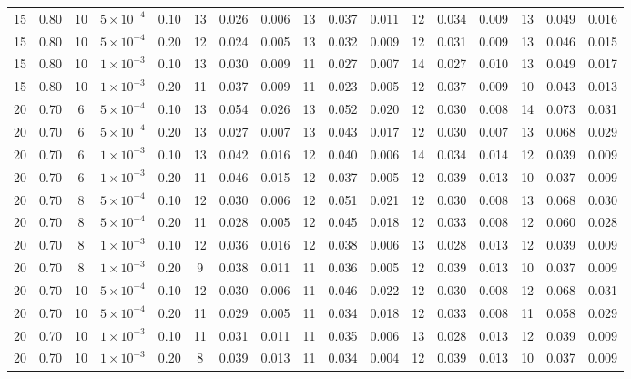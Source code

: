 \begin{longtable}{c c c c c c c c c c c c c c c c c }
15 & 0.80 & 10 & $5{\times}10^{-4}$ & 0.10 & 13 & 0.026 & 0.006 & 13 & 0.037 & 0.011 & 12 & 0.034 & 0.009 & 13 & 0.049 & 0.016 \\
15 & 0.80 & 10 & $5{\times}10^{-4}$ & 0.20 & 12 & 0.024 & 0.005 & 13 & 0.032 & 0.009 & 12 & 0.031 & 0.009 & 13 & 0.046 & 0.015 \\
15 & 0.80 & 10 & $1{\times}10^{-3}$ & 0.10 & 13 & 0.030 & 0.009 & 11 & 0.027 & 0.007 & 14 & 0.027 & 0.010 & 13 & 0.049 & 0.017 \\
15 & 0.80 & 10 & $1{\times}10^{-3}$ & 0.20 & 11 & 0.037 & 0.009 & 11 & 0.023 & 0.005 & 12 & 0.037 & 0.009 & 10 & 0.043 & 0.013 \\
\midrule
20 & 0.70 & 6 & $5{\times}10^{-4}$ & 0.10 & 13 & 0.054 & 0.026 & 13 & 0.052 & 0.020 & 12 & 0.030 & 0.008 & 14 & 0.073 & 0.031 \\
20 & 0.70 & 6 & $5{\times}10^{-4}$ & 0.20 & 13 & 0.027 & 0.007 & 13 & 0.043 & 0.017 & 12 & 0.030 & 0.007 & 13 & 0.068 & 0.029 \\
20 & 0.70 & 6 & $1{\times}10^{-3}$ & 0.10 & 13 & 0.042 & 0.016 & 12 & 0.040 & 0.006 & 14 & 0.034 & 0.014 & 12 & 0.039 & 0.009 \\
20 & 0.70 & 6 & $1{\times}10^{-3}$ & 0.20 & 11 & 0.046 & 0.015 & 12 & 0.037 & 0.005 & 12 & 0.039 & 0.013 & 10 & 0.037 & 0.009 \\
20 & 0.70 & 8 & $5{\times}10^{-4}$ & 0.10 & 12 & 0.030 & 0.006 & 12 & 0.051 & 0.021 & 12 & 0.030 & 0.008 & 13 & 0.068 & 0.030 \\
20 & 0.70 & 8 & $5{\times}10^{-4}$ & 0.20 & 11 & 0.028 & 0.005 & 12 & 0.045 & 0.018 & 12 & 0.033 & 0.008 & 12 & 0.060 & 0.028 \\
20 & 0.70 & 8 & $1{\times}10^{-3}$ & 0.10 & 12 & 0.036 & 0.016 & 12 & 0.038 & 0.006 & 13 & 0.028 & 0.013 & 12 & 0.039 & 0.009 \\
20 & 0.70 & 8 & $1{\times}10^{-3}$ & 0.20 & 9 & 0.038 & 0.011 & 11 & 0.036 & 0.005 & 12 & 0.039 & 0.013 & 10 & 0.037 & 0.009 \\
20 & 0.70 & 10 & $5{\times}10^{-4}$ & 0.10 & 12 & 0.030 & 0.006 & 11 & 0.046 & 0.022 & 12 & 0.030 & 0.008 & 12 & 0.068 & 0.031 \\
20 & 0.70 & 10 & $5{\times}10^{-4}$ & 0.20 & 11 & 0.029 & 0.005 & 11 & 0.034 & 0.018 & 12 & 0.033 & 0.008 & 11 & 0.058 & 0.029 \\
20 & 0.70 & 10 & $1{\times}10^{-3}$ & 0.10 & 11 & 0.031 & 0.011 & 11 & 0.035 & 0.006 & 13 & 0.028 & 0.013 & 12 & 0.039 & 0.009 \\
20 & 0.70 & 10 & $1{\times}10^{-3}$ & 0.20 & 8 & 0.039 & 0.013 & 11 & 0.034 & 0.004 & 12 & 0.039 & 0.013 & 10 & 0.037 & 0.009 \\

\end{longtable}
